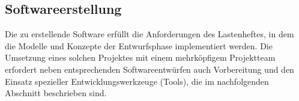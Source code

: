 \subsection{Softwareerstellung}
\label{sec:Softwareerstellung}

Die zu erstellende Software erfüllt die Anforderungen des Lastenheftes, in dem die Modelle und Konzepte der Entwurfsphase implementiert werden. Die Umsetzung eines solchen Projektes mit einem mehrköpfigem Projektteam erfordert neben entsprechenden Softwareentwürfen auch Vorbereitung und den Einsatz spezieller Entwicklungswerkzeuge (Tools), die im nachfolgenden Abschnitt beschrieben sind.




